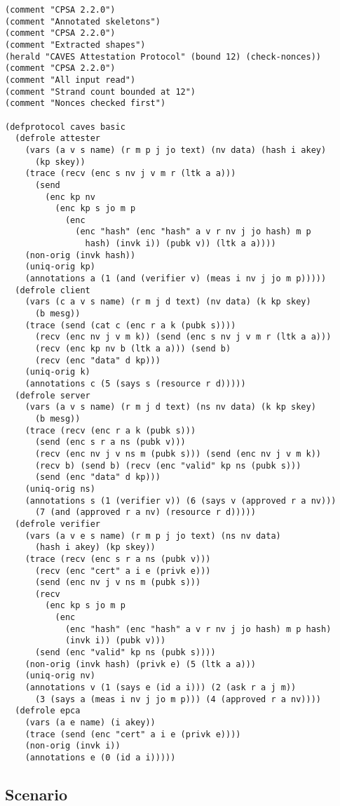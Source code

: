 \documentclass[titlepage,12pt]{article}
\theoremstyle{definition}
\begin{document}
\begingroup\small
\begin{verbatim}
(comment "CPSA 2.2.0")
(comment "Annotated skeletons")
(comment "CPSA 2.2.0")
(comment "Extracted shapes")
(herald "CAVES Attestation Protocol" (bound 12) (check-nonces))
(comment "CPSA 2.2.0")
(comment "All input read")
(comment "Strand count bounded at 12")
(comment "Nonces checked first")

(defprotocol caves basic
  (defrole attester
    (vars (a v s name) (r m p j jo text) (nv data) (hash i akey)
      (kp skey))
    (trace (recv (enc s nv j v m r (ltk a a)))
      (send
        (enc kp nv
          (enc kp s jo m p
            (enc
              (enc "hash" (enc "hash" a v r nv j jo hash) m p
                hash) (invk i)) (pubk v)) (ltk a a))))
    (non-orig (invk hash))
    (uniq-orig kp)
    (annotations a (1 (and (verifier v) (meas i nv j jo m p)))))
  (defrole client
    (vars (c a v s name) (r m j d text) (nv data) (k kp skey)
      (b mesg))
    (trace (send (cat c (enc r a k (pubk s))))
      (recv (enc nv j v m k)) (send (enc s nv j v m r (ltk a a)))
      (recv (enc kp nv b (ltk a a))) (send b)
      (recv (enc "data" d kp)))
    (uniq-orig k)
    (annotations c (5 (says s (resource r d)))))
  (defrole server
    (vars (a v s name) (r m j d text) (ns nv data) (k kp skey)
      (b mesg))
    (trace (recv (enc r a k (pubk s)))
      (send (enc s r a ns (pubk v)))
      (recv (enc nv j v ns m (pubk s))) (send (enc nv j v m k))
      (recv b) (send b) (recv (enc "valid" kp ns (pubk s)))
      (send (enc "data" d kp)))
    (uniq-orig ns)
    (annotations s (1 (verifier v)) (6 (says v (approved r a nv)))
      (7 (and (approved r a nv) (resource r d)))))
  (defrole verifier
    (vars (a v e s name) (r m p j jo text) (ns nv data)
      (hash i akey) (kp skey))
    (trace (recv (enc s r a ns (pubk v)))
      (recv (enc "cert" a i e (privk e)))
      (send (enc nv j v ns m (pubk s)))
      (recv
        (enc kp s jo m p
          (enc
            (enc "hash" (enc "hash" a v r nv j jo hash) m p hash)
            (invk i)) (pubk v)))
      (send (enc "valid" kp ns (pubk s))))
    (non-orig (invk hash) (privk e) (5 (ltk a a)))
    (uniq-orig nv)
    (annotations v (1 (says e (id a i))) (2 (ask r a j m))
      (3 (says a (meas i nv j jo m p))) (4 (approved r a nv))))
  (defrole epca
    (vars (a e name) (i akey))
    (trace (send (enc "cert" a i e (privk e))))
    (non-orig (invk i))
    (annotations e (0 (id a i)))))
\end{verbatim}

\subsection{Scenario}
\end{document}
